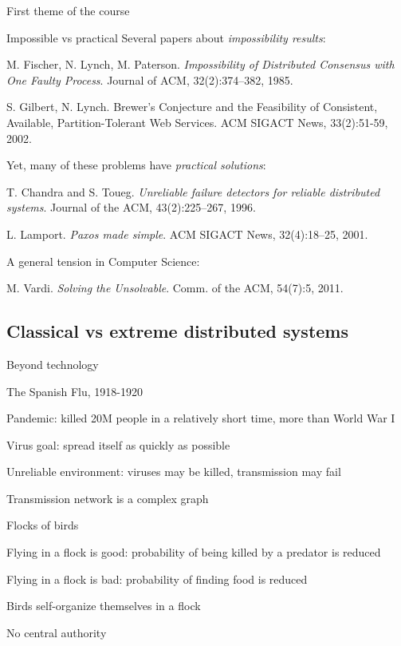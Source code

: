 \begin{frame}{First theme of the course}

\begin{block}{Impossible vs practical}
Several papers about \emph{impossibility results}:
{\footnotesize
\BI
\item M. Fischer, N. Lynch, M. Paterson. \emph{Impossibility of Distributed Consensus with One Faulty Process}. Journal of ACM, 32(2):374--382, 1985.
\item S. Gilbert, N. Lynch. Brewer's Conjecture and the Feasibility of Consistent, Available, Partition-Tolerant Web Services. ACM SIGACT News, 33(2):51-59, 2002.
\EI
}

\bigskip
Yet, many of these problems have \emph{practical solutions}:
{\footnotesize
\BI
\item T. Chandra and S. Toueg. \emph{Unreliable failure detectors for reliable distributed systems}. Journal of the ACM, 43(2):225--267, 1996.
\item L. Lamport. \emph{Paxos made simple}. ACM SIGACT News, 32(4):18--25, 2001.
\EI
}
\end{block}

\bigskip
A general tension in Computer Science:
\BI
\item {\footnotesize M. Vardi. \emph{Solving the Unsolvable}. Comm. of the ACM, 54(7):5, 2011}. 
\EI

\end{frame}

\subsection{Classical vs extreme distributed systems}

\begin{frame}{Beyond technology}
\begin{block}{The Spanish Flu, 1918-1920}
\BI
\item Pandemic: killed 20M people in a relatively short time, more than World War I
\item Virus goal: spread itself as quickly as possible
\item Unreliable environment: viruses may be killed, transmission may fail
\item Transmission network is a complex graph
\EI
\end{block}

\begin{block}{Flocks of birds}
\BI
\item Flying in a flock is good: probability of being killed by a predator
  is reduced
\item Flying in a flock is bad: probability of finding food is reduced
\item Birds self-organize themselves in a flock
\item No central authority
\EI
\end{block}

\end{frame}



